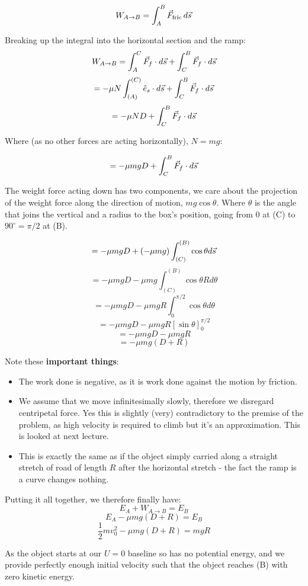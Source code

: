 \[
    W_{A \to B} = \int_{A}^{B} \vec{F}_\text{fric} \, d \vec{s}
\]

Breaking up the integral into the horizontal section and the ramp:
\[
    W_{A \to B} = \int_{A}^{C} \vec{F}_f \cdot d\vec{s} + \int_{C}^{B} \vec{F}_f \cdot d\vec{s}
\]
\[
    = - \mu N \int_{(A)}^{(C)} \hat{e}_s \cdot d\vec{s} +  \int_{C}^{B} \vec{F}_f \cdot d\vec{s}
\]
\[
    = - \mu N D +  \int_{C}^{B} \vec{F}_f \cdot d\vec{s}
\]

Where (as no other forces are acting horizontally), $N = mg$:

\[
    = -\mu mg D +  \int_{C}^{B} \vec{F}_f \cdot d\vec{s}
\]

The weight force acting down has two components, we care about the projection of the weight force along the direction of motion, $mg \cos \theta$. Where $\theta$ is the angle that joins the vertical and a radius to the box's position, going from $0$ at (C) to $90^\circ = \pi / 2$ at (B).


\[
    = - \mu mg D + (- \mu mg) \int_{(C)}^{(B)} \cos \theta d\vec{s}
\]
\[
    = - \mu mg D - \mu mg \int_{(C)}^{(B)} \cos \theta R d \theta
\]
\[
    = - \mu mg D - \mu mg R \int_{0}^{\pi / 2} \cos \theta d \theta
\]
\[
    = - \mu mg D - \mu mg R \left[\sin \theta\right]_0^{\pi / 2}
\]
\[
    = - \mu mg D - \mu mg R
\]
\[
    = - \mu mg \left(D + R\right)
\]

Note these \textbf{important things}:
\begin{itemize}
    \item The work done is negative, as it is work done against the motion by friction.
    \item We assume that we move infinitesimally slowly, therefore we disregard centripetal force. Yes this is slightly (very) contradictory to the premise of the problem, as high velocity is required to climb but it's an approximation. This is looked at next lecture.
    \item This is exactly the same as if the object simply carried along a straight stretch of road of length $R$ after the horizontal stretch - the fact the ramp is a curve changes nothing.
\end{itemize}

Putting it all together, we therefore finally have:
\[
    E_A + W_{A \to B} = E_B
\]
\[
    E_A  - \mu mg \left(D + R\right) = E_B
\]
\[
    \frac{1}{2}mv_0^2 - \mu mg \left(D + R\right) = mgR
\]

As the object starts at our $U = 0$ baseline so has no potential energy, and we provide perfectly enough initial velocity such that the object reaches (B) with zero kinetic energy.

